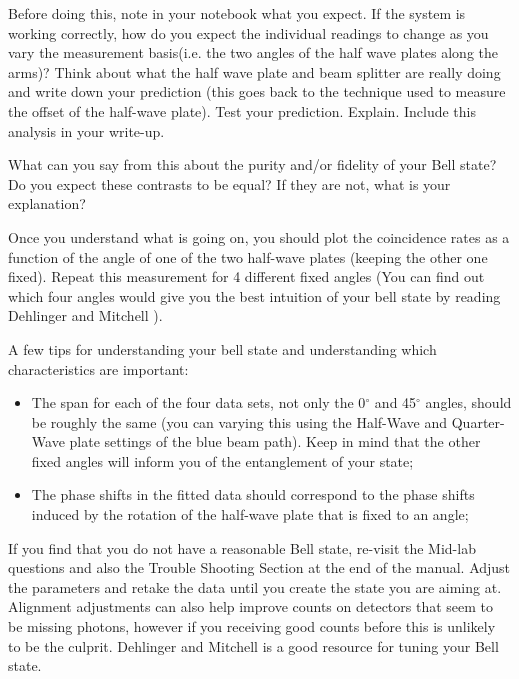 \documentclass{../lab}
\begin{document}
Before doing this, note in your notebook what you expect. If the system is working correctly, how do you expect the individual readings to change as you vary the measurement basis(i.e. the two angles of the half wave plates along the arms)? Think about what the half wave plate and beam splitter are really doing and write down your prediction (this goes back to the technique used to measure the offset of the half-wave plate). Test your prediction. Explain. Include this analysis in your write-up.


 What can you say from this about the purity and/or fidelity of your Bell state? Do you expect these contrasts to be equal? If they are not, what is your explanation? 

Once you understand what is going on, you should plot the coincidence rates as a function of the angle of one of the two half-wave plates (keeping the other one fixed). Repeat this measurement for 4 different fixed angles (You can find out which four angles would give you the best intuition of your bell state by reading Dehlinger and Mitchell \cite{Dehlinger}).

A few tips for understanding your bell state and understanding which characteristics are important:

\begin{itemize}
    \item The span for each of the four data sets, not only the 0$^\circ$ and 45$^\circ$ angles, should be roughly the same (you can varying this using the Half-Wave and Quarter-Wave plate settings of the blue beam path). Keep in mind that the other fixed angles will inform you of the entanglement of your state;

    \item The phase shifts in the fitted data should correspond to the phase shifts induced by the rotation of the half-wave plate that is fixed to an angle;
\end{itemize}

If you find that you do not have a reasonable Bell state, re-visit the Mid-lab questions and also the Trouble Shooting Section at the end of the manual. Adjust the parameters and retake the data until you create the state you are aiming at. Alignment adjustments can also help improve counts on detectors that seem to be missing photons, however if you receiving good counts before this is unlikely to be the culprit. Dehlinger and Mitchell \cite{Dehlinger} is a good resource for tuning your Bell state.
\end{document}
